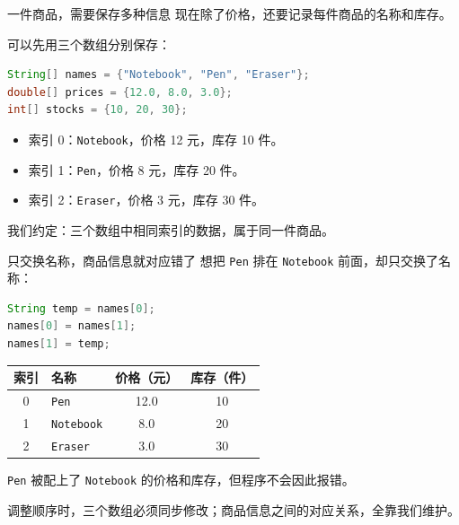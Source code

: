 \documentclass[aspectratio=169]{beamer}
\begin{document}
\begin{frame}[fragile]{一件商品，需要保存多种信息}
  现在除了价格，还要记录每件商品的名称和库存。
  \par\medskip
  可以先用三个数组分别保存：
  \begin{lstlisting}[language=Java]
String[] names = {"Notebook", "Pen", "Eraser"};
double[] prices = {12.0, 8.0, 3.0};
int[] stocks = {10, 20, 30};
  \end{lstlisting}
  \begin{itemize}
    \item 索引 0：\texttt{Notebook}，价格 12 元，库存 10 件。
    \item 索引 1：\texttt{Pen}，价格 8 元，库存 20 件。
    \item 索引 2：\texttt{Eraser}，价格 3 元，库存 30 件。
  \end{itemize}
  \medskip
  我们约定：\alert{三个数组中相同索引的数据，属于同一件商品}。
\end{frame}

\begin{frame}[fragile]{只交换名称，商品信息就对应错了}
  想把 \texttt{Pen} 排在 \texttt{Notebook} 前面，却只交换了名称：
  \begin{lstlisting}[language=Java]
String temp = names[0];
names[0] = names[1];
names[1] = temp;
  \end{lstlisting}
  \centering
  {\renewcommand{\arraystretch}{1.3}
  \begin{tabular}{clcc}
    索引 & 名称 & 价格（元） & 库存（件） \\
    \hline
    0 & \texttt{Pen} & 12.0 & 10 \\
    1 & \texttt{Notebook} & 8.0 & 20 \\
    2 & \texttt{Eraser} & 3.0 & 30 \\
  \end{tabular}\par}
  \medskip
  \raggedright
  \texttt{Pen} 被配上了 \texttt{Notebook} 的价格和库存，但程序不会因此报错。
  \par\medskip
  调整顺序时，三个数组必须同步修改；\alert{商品信息之间的对应关系，全靠我们维护}。
\end{frame}
\end{document}
